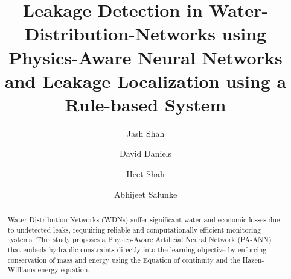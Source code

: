 \documentclass[final,5p,times,twocolumn,authoryear]{elsarticle}
\begin{document}
\begin{frontmatter}



\title{Leakage Detection in Water-Distribution-Networks using Physics-Aware Neural Networks and Leakage Localization using a Rule-based System}



\author[inst1,eq]{Jash Shah}
\author[inst1,eq]{David Daniels}
\author[inst1,eq]{Heet Shah}
\author[inst1,eq]{Abhijeet Salunke}

\vspace{0.3cm}



\begin{abstract}
Water Distribution Networks (WDNs) suffer significant water and economic losses due to undetected leaks, requuiring reliable and computationally efficient monitoring systems. This study proposes a Physics-Aware Artificial Neural Network (PA-ANN) that embeds hydraulic constraints directly into the learning objective by enforcing conservation of mass and energy using the Equation of continuity and the Hazen-Williams energy equation.


\end{abstract}
\end{frontmatter}
\end{document}

